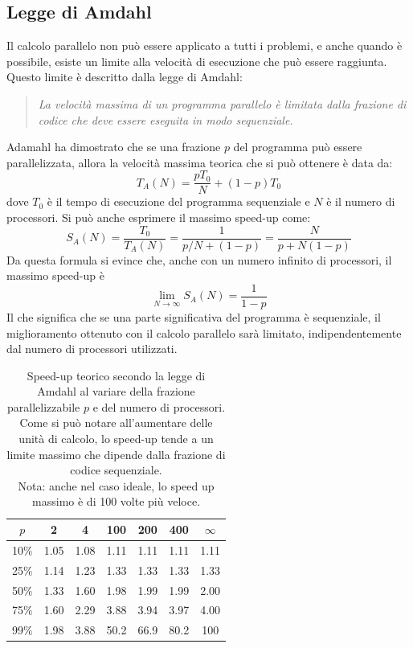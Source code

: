 \subsection{Legge di Amdahl}
Il calcolo parallelo non può essere applicato a tutti i problemi, e anche quando è possibile, esiste un limite alla velocità di esecuzione che può essere raggiunta. Questo limite è descritto dalla legge di Amdahl:

\begin{quote}
\textit{La velocità massima di un programma parallelo è limitata dalla frazione di codice che deve essere eseguita in modo sequenziale.}
\end{quote}
Adamahl ha dimostrato che se una frazione $p$ del programma può essere parallelizzata, allora la velocità massima teorica che si può ottenere è data da:
\[
T_A(N) = \frac{p T_0}{N} + (1-p) T_0
\]
dove $T_0$ è il tempo di esecuzione del programma sequenziale e $N$ è il numero di processori. Si può anche esprimere il massimo speed-up come:
\[
S_A(N) = \frac{T_0}{T_A(N)} = \frac{1}{p/N + (1-p)} = \frac{N}{p + N(1-p)}
\]
Da questa formula si evince che, anche con un numero infinito di processori, il massimo speed-up è
\[
\lim_{N \to \infty} S_A(N) = \frac{1}{1-p}
\]
Il che significa che se una parte significativa del programma è sequenziale, il miglioramento ottenuto con il calcolo parallelo sarà limitato, indipendentemente dal numero di processori utilizzati.

\begin{table}[h]
\centering
\begin{tabular}{c|cccccc}
$p$ & 2 & 4 & 100 & 200 & 400 & $\infty$ \\
\hline
10\% & 1.05 & 1.08 & 1.11 & 1.11 & 1.11 & 1.11 \\
25\% & 1.14 & 1.23 & 1.33 & 1.33 & 1.33 & 1.33 \\
50\% & 1.33 & 1.60 & 1.98 & 1.99 & 1.99 & 2.00 \\
75\% & 1.60 & 2.29 & 3.88 & 3.94 & 3.97 & 4.00 \\
99\% & 1.98 & 3.88 & 50.2 & 66.9 & 80.2 & 100 \\
\end{tabular}
\caption{Speed-up teorico secondo la legge di Amdahl al variare della frazione parallelizzabile $p$ e del numero di processori. Come si può notare all'aumentare delle unità di calcolo, lo speed-up tende a un limite massimo che dipende dalla frazione di codice sequenziale.\\Nota: anche nel caso ideale, lo speed up massimo è di 100 volte più veloce.}
\end{table}

